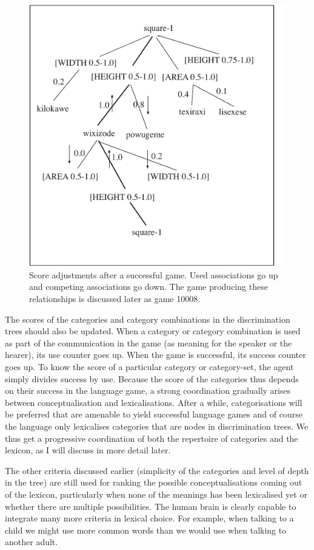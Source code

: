 \begin{figure}[htbp]
  \centerline{\includegraphics[width=.75\textwidth]{chap6/figs/incr-decr2.pdf}}
\caption{\label{incr-decr2}Score adjustments after a successful game. Used 
associations go up and competing associations go down.
The game producing these relationships is discussed
later as game 10008.}
\end{figure}

The scores of the categories and category
combinations in the discrimination trees should also 
be updated. When a category or category combination
is used as part of the communication 
in the game (as meaning for the speaker or
the hearer), its use counter goes up. When 
the game is successful, its success counter 
goes up. To know the score of a particular 
category or category-set, the agent simply 
divides success by use. Because the score of the categories 
thus depends on their success in the 
language game, a strong coordination gradually 
arises between conceptualisation and 
lexicalisations. After a while, categorisations
will be preferred that are amenable to yield
successful language games and of course the 
language only lexicalises categories that are 
nodes in discrimination trees. 
We thus get a progressive coordination of 
both the repertoire of categories and the 
lexicon, as I will discuss in more detail later. 

The other criteria discussed earlier (simplicity of 
the categories and level of depth in the tree) are 
still used for ranking the possible conceptualisations
coming out of the lexicon, particularly when none
of the meanings has been lexicalised yet or whether
there are multiple possibilities. The human brain 
is clearly capable to integrate many more criteria
in lexical choice. For example, when talking to a 
child we might use more common words than we would use 
when talking to another adult. 

